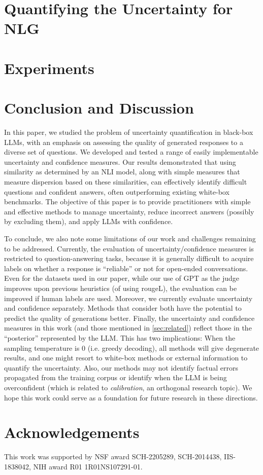 \documentclass[10pt]{article} %
\begin{document}
\section{Quantifying the Uncertainty for NLG}\label{sec:methods}



\section{Experiments}\label{sec:exp}



\section{Conclusion and Discussion}\label{sec:conclusion}

In this paper, we studied the problem of uncertainty quantification in black-box LLMs, with an emphasis on assessing the quality of generated responses to a diverse set of questions. We developed and tested a range of easily implementable uncertainty and confidence measures. Our results demonstrated that using similarity as determined by an NLI model, along with simple measures that measure dispersion based on these similarities, can effectively identify difficult questions and confident answers, often outperforming existing white-box benchmarks. The objective of this paper is to provide practitioners with simple and effective methods to manage uncertainty, reduce incorrect answers (possibly by excluding them), and apply LLMs with confidence.

To conclude, we also note some limitations of our work and challenges remaining to be addressed.
Currently, the evaluation of uncertainty/confidence measures is restricted to question-answering tasks, because it is generally difficult to acquire labels on whether a response is ``reliable'' or not for open-ended conversations.
Even for the datasets used in our paper, while our use of GPT as the judge improves upon previous heuristics (of using rougeL), the evaluation can be improved if human labels are used. 
Moreover, we currently evaluate uncertainty and confidence separately.
Methods that consider both have the potential to predict the quality of generations better.
Finally, the uncertainty and confidence measures in this work (and those mentioned in \cref{sec:related}) reflect those in the ``posterior'' represented by the LLM.
This has two implications: When the sampling temperature is 0 (i.e. greedy decoding), all methods will give degenerate results, and one might resort to white-box methods or external information to quantify the uncertainty.
Also, our methods may not identify factual errors propagated from the training corpus or identify when the LLM is being overconfident (which is related to \textit{calibration}, an orthogonal research topic).
We hope this work could serve as a foundation for future research in these directions.


\section*{Acknowledgements}
This work was supported by NSF award SCH-2205289, SCH-2014438, IIS-1838042, NIH award R01 1R01NS107291-01.




\appendix

\end{document}
